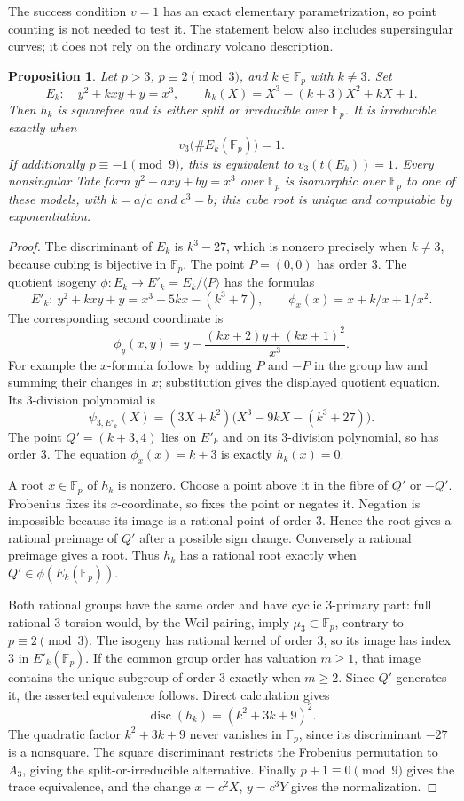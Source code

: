 \documentclass[11pt]{article}
\newtheorem{proposition}[theorem]{Proposition}
\theoremstyle{definition}
\theoremstyle{remark}
\begin{document}
The success condition $v=1$ has an exact elementary
parametrization, so point counting is not needed to test it.
The statement below also includes supersingular curves; it
does not rely on the ordinary volcano description.

\begin{proposition}\label{prop:tate-simplest-cubic}
Let $p>3$, $p\equiv2\pmod3$, and $k\in\mathbb F_p$ with
$k\ne3$.  Set
\[
 E_k:\quad y^2+kxy+y=x^3,
 \qquad h_k(X)=X^3-(k+3)X^2+kX+1.
\]
Then $h_k$ is squarefree and is either split or irreducible
over $\mathbb F_p$.  It is irreducible exactly when
\[
 v_3\bigl(\#E_k(\mathbb F_p)\bigr)=1.
\]
If additionally $p\equiv-1\pmod9$, this is equivalent to
$v_3(t(E_k))=1$.
Every nonsingular Tate form $y^2+axy+by=x^3$ over
$\mathbb F_p$ is isomorphic over $\mathbb F_p$ to one of
these models, with $k=a/c$ and $c^3=b$; this cube root is
unique and computable by exponentiation.
\end{proposition}

\begin{proof}
The discriminant of $E_k$ is $k^3-27$, which is nonzero
precisely when $k\ne3$, because cubing is bijective in
$\mathbb F_p$.  The point $P=(0,0)$ has order $3$.
The quotient isogeny $\phi:E_k\to E'_k=E_k/\langle P\rangle$
has the formulas
\[
 E'_k:\ y^2+kxy+y=x^3-5kx-(k^3+7),
 \qquad \phi_x(x)=x+k/x+1/x^2.
\]
The corresponding second coordinate is
\[
 \phi_y(x,y)=y-
 \frac{(kx+2)y+(kx+1)^2}{x^3}.
\]
For example the $x$-formula follows by adding $P$ and $-P$
in the group law and summing their changes in $x$;
substitution gives the displayed quotient equation.
Its $3$-division polynomial is
\[
 \psi_{3,E'_k}(X)
 =(3X+k^2)\bigl(X^3-9kX-(k^3+27)\bigr).
\]
The point $Q'=(k+3,4)$ lies on $E'_k$ and on its
$3$-division polynomial, so has order $3$.
The equation $\phi_x(x)=k+3$ is exactly $h_k(x)=0$.

A root $x\in\mathbb F_p$ of $h_k$ is nonzero.
Choose a point above it in the fibre of $Q'$ or $-Q'$.
Frobenius fixes its $x$-coordinate, so fixes the point or
negates it.  Negation is impossible because its image is
a rational point of order $3$.  Hence the root gives a
rational preimage of $Q'$ after a possible sign change.
Conversely a rational preimage gives a root.
Thus $h_k$ has a rational root exactly when
$Q'\in\phi(E_k(\mathbb F_p))$.

Both rational groups have the same order and have cyclic
$3$-primary part: full rational $3$-torsion would, by the
Weil pairing, imply $\mu_3\subset\mathbb F_p$, contrary to
$p\equiv2\pmod3$.  The isogeny has rational kernel of
order $3$, so its image has index $3$ in $E'_k(\mathbb F_p)$.
If the common group order has valuation $m\ge1$, that image
contains the unique subgroup of order $3$ exactly when
$m\ge2$.  Since $Q'$ generates it, the asserted equivalence
follows.  Direct calculation gives
\[
 \operatorname{disc}(h_k)=(k^2+3k+9)^2.
\]
The quadratic factor $k^2+3k+9$ never vanishes in
$\mathbb F_p$, since its discriminant $-27$ is a nonsquare.
The square discriminant restricts the Frobenius permutation
to $A_3$, giving the split-or-irreducible alternative.
Finally $p+1\equiv0\pmod9$ gives the trace equivalence,
and the change $x=c^2X$, $y=c^3Y$ gives the normalization.
\end{proof}
\end{document}

